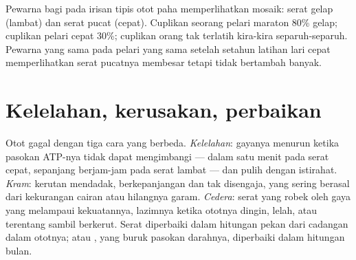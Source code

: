 \begin{example}\label{ex:g10:muscles-and-joints:biopsy}
Pewarna bagi   pada irisan tipis otot paha
memperlihatkan mosaik: serat gelap (lambat) dan serat pucat (cepat).
Cuplikan seorang pelari maraton 80\% gelap; cuplikan pelari cepat 30\%;
cuplikan orang tak terlatih kira-kira separuh-separuh. Pewarna yang
sama pada pelari yang sama setelah setahun latihan lari cepat
memperlihatkan serat pucatnya membesar tetapi tidak bertambah banyak.
\end{example}

\section{Kelelahan, kerusakan, perbaikan}

\begin{proposition}\label{prop:g10:muscles-and-joints:limits}
Otot gagal dengan tiga cara yang berbeda. \emph{Kelelahan}: gayanya
menurun ketika pasokan ATP-nya tidak dapat mengimbangi --- dalam satu
menit pada serat cepat, sepanjang berjam-jam pada serat lambat --- dan
pulih dengan istirahat. \emph{Kram}: kerutan mendadak, berkepanjangan
dan tak disengaja, yang sering berasal dari kekurangan cairan atau
hilangnya garam. \emph{Cedera}: serat yang robek oleh gaya yang
melampaui kekuatannya, lazimnya ketika ototnya dingin, lelah, atau
terentang sambil berkerut. Serat diperbaiki dalam hitungan pekan dari
 cadangan dalam ototnya;  atau , yang buruk pasokan
darahnya, diperbaiki dalam hitungan bulan.
\end{proposition}
\admitted

